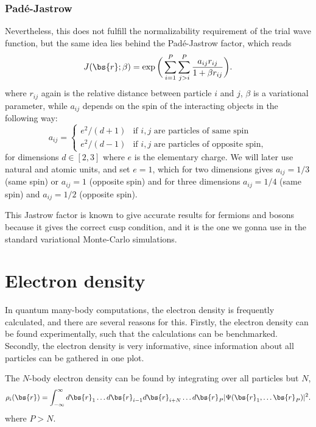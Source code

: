 \subsubsection{Padé-Jastrow}
Nevertheless, this does not fulfill the normalizability requirement of the trial wave function, but the same idea lies behind the Padé-Jastrow factor, which reads
\begin{equation}
J(\bs{r};\beta) = \exp\bigg(\sum_{i=1}^P\sum_{j>i}^P\frac{a_{ij}r_{ij}}{1+\beta r_{ij}}\bigg).
\label{eq:PadeJastrow}
\end{equation}
where $r_{ij}$ again is the relative distance between particle $i$ and $j$, $\beta$ is a variational parameter, while $a_{ij}$ depends on the spin of the interacting objects in the following way:
\begin{equation}
\label{eq:ajastrow}
a_{ij}=
\begin{cases} 
e^2/(d+1) & \text{if $i,j$ are particles of same spin} \\
e^2/(d-1) & \text{if $i,j$ are particles of opposite spin},
\end{cases}
\end{equation}
for dimensions $d\in[2,3]$ where $e$ is the elementary charge. We will later use natural and atomic units, and set $e=1$, which for two dimensions gives $a_{ij}=1/3$ (same spin) or $a_{ij}=1$ (opposite spin) and for three dimensions $a_{ij}=1/4$ (same spin) and $a_{ij}=1/2$ (opposite spin).

This Jastrow factor is known to give accurate results for fermions and bosons because it gives the correct cusp condition, and it is the one we gonna use in the standard variational Monte-Carlo simulations.

\section{Electron density}
In quantum many-body computations, the electron density is frequently calculated, and there are several reasons for this. Firstly, the electron density can be found experimentally, such that the calculations can be benchmarked. Secondly, the electron density is very informative, since information about all particles can be gathered in one plot.

The $N$-body electron density can be found by integrating over all particles but $N$, 
\begin{equation}
\label{eq:electron_density}
\rho_i(\bs{r})=\int_{-\infty}^{\infty}d\bs{r}_1\hdots d\bs{r}_{i-1}d\bs{r}_{i+N}\hdots d\bs{r}_P |\Psi(\bs{r}_1,\hdots \bs{r}_P)|^2.
\end{equation}
where $P>N$.

